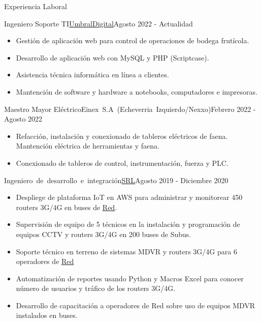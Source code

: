 \documentclass[]{mcdowellcv}
\begin{document}
	\makeheader
	
	\begin{cvsection}{Experiencia Laboral}
		\begin{cvsubsection}{Ingeniero Soporte TI}{\mbox{\href{https://umbraldigital.cl/}{UmbralDigital}}}{Agosto 2022 - Actualidad}		
			\begin{itemize}
				\item Gestión de aplicación web para control de operaciones de bodega frutícola.
				\item Desarrollo de aplicación web con MySQL y PHP (Scriptcase).
				\item Asistencia técnica informática en línea a clientes.
				\item Mantención de software y hardware a notebooks, computadores e impresoras.
			\end{itemize}
		\end{cvsubsection}
		\begin{cvsubsection}{Maestro Mayor Eléctrico}{\mbox{Einex S.A (Echeverria Izquierdo/Nexxo)}}{Febrero 2022 - Agosto 2022}		
			\begin{itemize}
				\item Refacción, instalación y conexionado de tableros eléctricos de faena. Mantención eléctrica de herramientas y faena.
				\item Conexionado de tableros de control, instrumentación, fuerza y PLC.
			\end{itemize}
		\end{cvsubsection}
		
		\begin{cvsubsection}{\mbox{Ingeniero de desarrollo e integración}}{\href{https://www.srl.cl/empresa/}{SRL}}{Agosto 2019 - Diciembre 2020}	
			\begin{itemize}
				\item Despliege de plataforma IoT en AWS para administrar y monitorear 450 routers 3G/4G en buses de \href{https://www.red.cl/}{Red}. 
				\item Supervisión de equipo de 5 técnicos en la instalación y programación de equipos CCTV y routers 3G/4G en 200 buses de Subus.
				\item Soporte técnico en terreno de sistemas MDVR y routers 3G/4G para 6 operadores de \href{https://www.red.cl/}{Red}
				\item Automatización de reportes usando Python y Macros Excel para conocer número de usuarios y tráfico de los routers 3G/4G.
				\item Desarrollo de capacitación a operadores de Red sobre uso de equipos MDVR instalados en buses.
			\end{itemize}
		\end{cvsubsection}
		

\end{cvsection}
\end{document}
